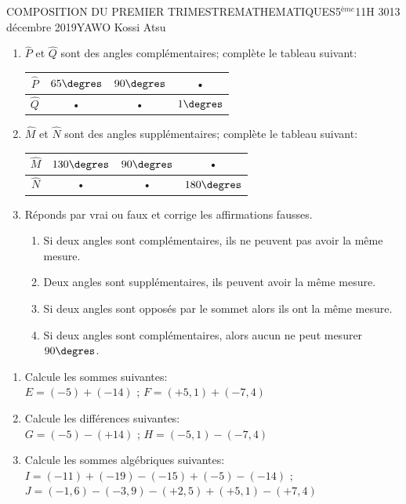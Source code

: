 \documentclass[12pt,a4paper]{book}
\newcommand{\prof}{YAWO Kossi Atsu}
\newcommand{\matiere}{MATHEMATIQUES}
\newcommand{\classe}{5$^{ème}$}
\begin{document}
\begin{devoir}{COMPOSITION DU PREMIER TRIMESTRE}{\matiere}{\classe}{1}{1H 30}{13 décembre 2019}{\prof}
\begin{exo}[5]
\begin{multicols}{2}
\begin{enumerate}
\item $\widehat{P}$ et $\widehat{Q}$ sont des angles complémentaires; complète le tableau suivant:\\
\begin{tabular}{|c|c|c|c|}
\hline 
$\widehat{P}$ & $65 \degres$ &  $90 \degres$ & • \\ 
\hline 
$\widehat{Q}$ & • & • &  $1 \degres$ \\ 
\hline 
\end{tabular} 

\item $\widehat{M}$ et $\widehat{N}$ sont des angles supplémentaires; complète le tableau suivant:\\
\begin{tabular}{|c|c|c|c|}
\hline 
$\widehat{M}$ & $130 \degres$ &  $90 \degres$ & • \\ 
\hline 
$\widehat{N}$ & • & • &  $180 \degres$ \\ 
\hline 
\end{tabular} 

\item Réponds par vrai ou faux et corrige les affirmations fausses.
\begin{enumerate}
\item Si deux angles sont complémentaires, ils ne peuvent pas avoir la même mesure.
\item Deux angles sont supplémentaires, ils peuvent avoir la même mesure.
\item Si deux angles sont opposés par le sommet alors ils ont la même mesure.
\item Si deux angles sont complémentaires, alors aucun ne peut mesurer $90\degres$.
\end{enumerate}
\end{enumerate} 
\end{multicols}
\end{exo}

\vspace{0.5cm}

\begin{exo}[7,5]
\begin{multicols}{2}
\begin{enumerate}
\item Calcule les sommes suivantes:\\
$E=(-5)+(-14)$ \qquad ; \qquad
$F=(+5,1)+(-7,4)$
\item Calcule les différences suivantes:\\
$G=(-5)-(+14)$ \qquad ; \qquad
$H=(-5,1)-(-7,4)$
\item Calcule les sommes algébriques suivantes:\\
$I=(-11)+(-19)-(-15)+(-5)-(-14)$ \qquad ; \qquad\\
$J=(-1,6)-(-3,9)-(+2,5)+(+5,1)-(+7,4)$


\end{enumerate}
\end{multicols}
\end{exo}
\end{devoir}
\end{document}
